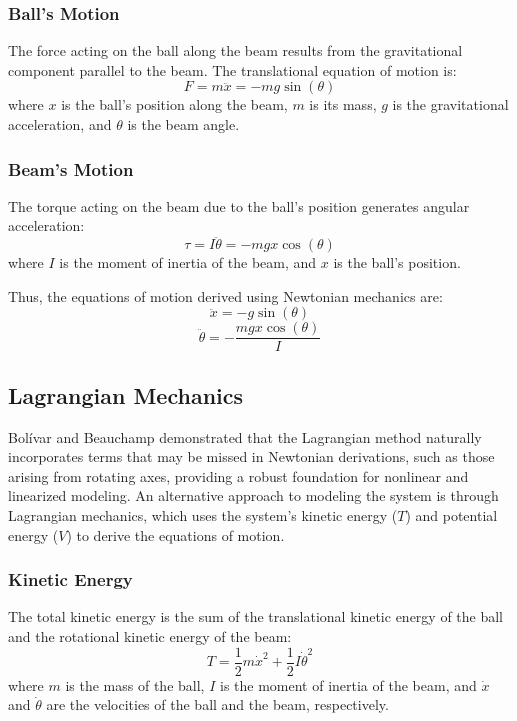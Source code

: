 \documentclass[conference]{IEEEtran}
\begin{document}
\subsubsection{Ball's Motion}
\label{subsubsec:model_newt_ball}
The force acting on the ball along the beam results from the gravitational component parallel to the beam. The translational equation of motion is:
\begin{equation}
F = m \ddot{x} = -m g \sin(\theta)
\end{equation}
where \(x\) is the ball's position along the beam, \(m\) is its mass, \(g\) is the gravitational acceleration, and \(\theta\) is the beam angle.

\subsubsection{Beam's Motion}
\label{subsubsec:model_newt_beam}
The torque acting on the beam due to the ball's position generates angular acceleration:
\begin{equation}
\tau = I \ddot{\theta} = -m g x \cos(\theta)
\end{equation}
where \(I\) is the moment of inertia of the beam, and \(x\) is the ball's position. 

Thus, the equations of motion derived using Newtonian mechanics are:
\begin{equation}
\ddot{x} = -g \sin(\theta)
\end{equation}
\begin{equation}
\ddot{\theta} = -\frac{m g x \cos(\theta)}{I}
\end{equation}

\subsection{Lagrangian Mechanics}
Bolívar and Beauchamp \cite{bolivar2014} demonstrated that the Lagrangian method naturally incorporates terms that may be missed in Newtonian derivations, such as those arising from rotating axes, providing a robust foundation for nonlinear and linearized modeling.
\label{subsec:model_lagrangian}
An alternative approach to modeling the system is through Lagrangian mechanics, which uses the system's kinetic energy (\(T\)) and potential energy (\(V\)) to derive the equations of motion.

\subsubsection{Kinetic Energy}
\label{subsubsec:model_lag_kinetic}
The total kinetic energy is the sum of the translational kinetic energy of the ball and the rotational kinetic energy of the beam:
\begin{equation}
T = \frac{1}{2} m \dot{x}^2 + \frac{1}{2} I \dot{\theta}^2
\end{equation}
where \(m\) is the mass of the ball, \(I\) is the moment of inertia of the beam, and \(\dot{x}\) and \(\dot{\theta}\) are the velocities of the ball and the beam, respectively.
\end{document}
